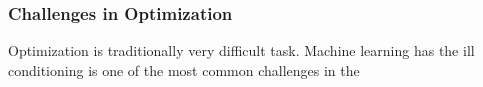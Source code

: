 \subsubsection{Challenges in Optimization}

Optimization is traditionally very difficult task. Machine learning has 
the ill conditioning is one of the most common challenges in the 
